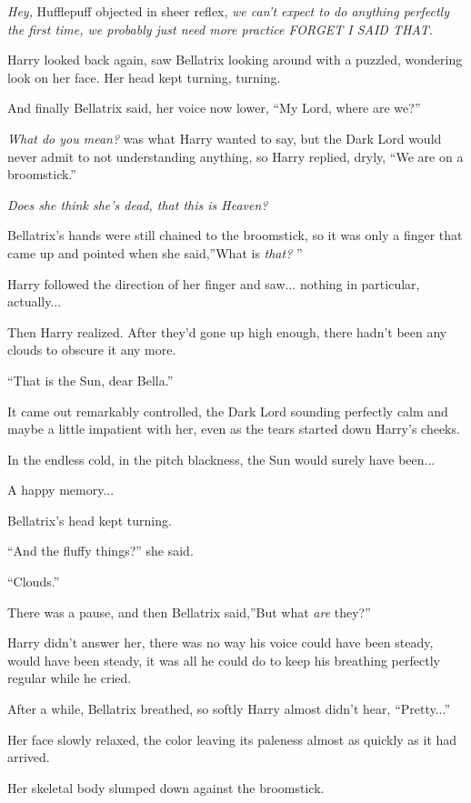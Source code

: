 \emph{Hey,} Hufflepuff objected in sheer reflex, \emph{we can't expect
to do anything perfectly the first time, we probably just need more
practice FORGET I SAID THAT.}

Harry looked back again, saw Bellatrix looking around with a puzzled,
wondering look on her face. Her head kept turning, turning.

And finally Bellatrix said, her voice now lower, ``My Lord, where are
we?''

\emph{What do you mean?} was what Harry wanted to say, but the Dark Lord
would never admit to not understanding anything, so Harry replied,
dryly, ``We are on a broomstick.''

\emph{Does she think she's dead, that this is Heaven?}

Bellatrix's hands were still chained to the broomstick, so it was only a
finger that came up and pointed when she said,''What is \emph{that?} ''

Harry followed the direction of her finger and saw... nothing in
particular, actually...

Then Harry realized. After they'd gone up high enough, there hadn't been
any clouds to obscure it any more.

``That is the Sun, dear Bella.''

It came out remarkably controlled, the Dark Lord sounding perfectly calm
and maybe a little impatient with her, even as the tears started down
Harry's cheeks.

In the endless cold, in the pitch blackness, the Sun would surely have
been...

A happy memory...

Bellatrix's head kept turning.

``And the fluffy things?'' she said.

``Clouds.''

There was a pause, and then Bellatrix said,''But what \emph{are} they?''

Harry didn't answer her, there was no way his voice could have been
steady, would have been steady, it was all he could do to keep his
breathing perfectly regular while he cried.

After a while, Bellatrix breathed, so softly Harry almost didn't hear,
``Pretty...''

Her face slowly relaxed, the color leaving its paleness almost as
quickly as it had arrived.

Her skeletal body slumped down against the broomstick.

